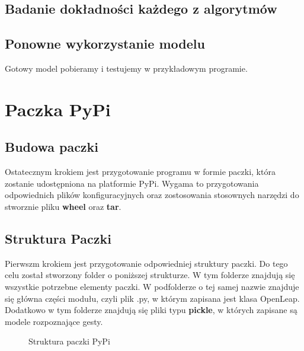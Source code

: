 \subsection{Badanie dokładności każdego z algorytmów}

\subsection{Ponowne wykorzystanie modelu}

\quad Gotowy model pobieramy i testujemy w przykładowym programie. 

\section{Paczka PyPi}

\subsection{Budowa paczki}

\quad Ostatecznym krokiem jest przygotowanie programu w formie paczki, która zostanie udostępniona na platformie PyPi. Wygama to przygotowania odpowiednich plików konfiguracyjnych oraz zostosowania stosownych narzędzi do stworznie pliku \textbf{wheel} oraz \textbf{tar}. 

\subsection{Struktura Paczki}
\quad Pierwszm krokiem jest przygotowanie odpowiedniej struktury paczki. Do tego celu został stworzony folder o poniższej strukturze. W tym folderze znajdują się wszystkie potrzebne elementy paczki. W podfolderze o tej samej nazwie znajduje się główna części modułu, czyli plik .py, w którym zapisana jest klasa OpenLeap. Dodatkowo w tym folderze znajdują się pliki typu \textbf{pickle}, w których zapisane są modele rozpoznające gesty.

\begin{figure}
\centering
    \begin{minipage}{7cm}
    \end{minipage}
    \caption{Struktura paczki PyPi}
\end{figure}

